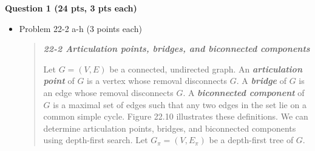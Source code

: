 \documentclass{article}
\begin{document}
\newpage


\begin{framed}
    \textbf{Question 1 (24 pts, 3 pts each)}
    \begin{itemize}
        \item Problem 22-2 a-h (3 points each)
        
        \begin{quote}
            \textbf{\textit{22-2 Articulation points, bridges, and biconnected 
            components}}
            
            Let $G = (V, E)$ be a connected, undirected graph. An \textbf{
            \textit{articulation point}} of $G$ is a vertex whose removal 
            disconnects $G$. A \textbf{\textit{bridge}} of $G$ is an edge whose 
            removal disconnects $G$. A \textbf{\textit{biconnected component}} 
            of $G$ is a maximal set of edges such that any two edges in the set 
            lie on a common simple cycle. Figure 22.10 illustrates these 
            definitions. We can determine articulation points, bridges, and 
            biconnected components using depth-first search. Let $G_\pi = (V, 
            E_\pi)$ be a depth-first tree of $G$.
            

\end{quote}
\end{itemize}
\end{framed}
\end{document}
